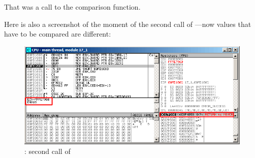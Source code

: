 That was a call to the comparison function.

\clearpage
Here is also a screenshot of the moment of the second call of \comp{}---now values that have to be compared are different:

\begin{figure}[H]
\centering
\includegraphics[scale=\FigScale]{patterns/18_pointers_to_functions/olly3.png}
\caption{\olly: second call of \comp}
\label{fig:qsort_olly3}
\end{figure}
